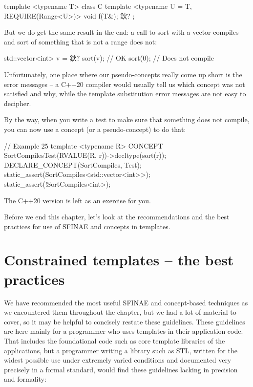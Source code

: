 \begin{code}
template <typename T> class C {
  template <typename U = T, REQUIRE(Range<U>)> void f(T&);
  鈥?
};
\end{code}

But we do get the same result in the end: a call to sort with a vector compiles and sort of something that is not a range does not:

\begin{code}
std::vector<int> v = 鈥?
sort(v);         // OK
sort(0);        // Does not compile
\end{code}

Unfortunately, one place where our pseudo-concepts really come up short is the error messages -- a C++20 compiler would usually tell us which concept was not satisfied and why, while the template substitution error messages are not easy to decipher.

By the way, when you write a test to make sure that something does not compile, you can now use a concept (or a pseudo-concept) to do that:

\begin{code}
// Example 25
template <typename R>
CONCEPT SortCompilesTest(RVALUE(R, r))->decltype(sort(r));
DECLARE_CONCEPT(SortCompiles, Test);
static_assert(SortCompiles<std::vector<int>>);
static_assert(!SortCompiles<int>);
\end{code}

The C++20 version is left as an exercise for you.

Before we end this chapter, let's look at the recommendations and the best practices for use of SFINAE and concepts in templates.

\section{Constrained templates -- the best practices}

We have recommended the most useful SFINAE and concept-based techniques as we encountered them throughout the chapter, but we had a lot of material to cover, so it may be helpful to concisely restate these guidelines. These guidelines are here mainly for a programmer who uses templates in their application code. That includes the foundational code such as core template libraries of the applications, but a programmer writing a library such as STL, written for the widest possible use under extremely varied conditions and documented very precisely in a formal standard, would find these guidelines lacking in precision and formality:

